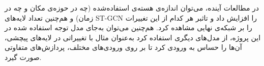 


در مطالعات آینده، می‌توان اندازه‌ی هسته‌ی استفاده‌شده (چه در حوزه‌ی مکان و چه در زمان) و هم‌چنین تعداد لایه‌های ST-GCN را افزایش داد و تاثبر هر کدام از این تغییرات را بر شبکه‌ی نهایی مشاهده کرد. هم‌چنین می‌توان به‌جای مدل توجه استفاده شده در این پروژه، از مدل‌های دیگری استفاده کرد به‌عنوان مثال با تغییراتی در لایه‌های پیچشی،‌ آن‌ها را حساس به ورودی کرد تا بر روی ورودی‌های مختلف، پردازش‌های متفاوتی صورت گیرد.  
